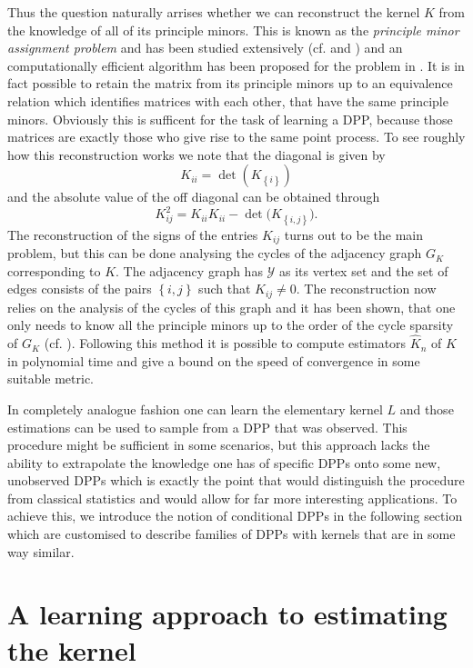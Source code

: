 Thus the question naturally arrises whether we can reconstruct the kernel \(K\) from the knowledge of all of its principle minors. This is known as the \emph{principle minor assignment problem} and has been studied extensively (cf. \cite{griffin2006principal} and \cite{urschel2017learning}) and an computationally efficient algorithm has been proposed for the problem in \cite{rising2015efficient}. It is in fact possible to retain the matrix from its principle minors up to an equivalence relation which identifies matrices with each other, that have the same principle minors. Obviously this is sufficent for the task of learning a DPP, because those matrices are exactly those who give rise to the same point process. To see roughly how this reconstruction works we note that the diagonal is given by
\[K_{ii} = \det(K_{\left\{ i\right\}})\]
and the absolute value of the off diagonal can be obtained through
\[K_{ij}^2 = K_{ii} K_{ii} - \det\big(K_{\left\{ i,j\right\}}\big). \]
The reconstruction of the signs of the entries \(K_{ij}\) turns out to be the main problem, but this can be done analysing the cycles of the adjacency graph \(G_K\) corresponding to \(K\). The adjacency graph has \(\mathcal Y\) as its vertex set and the set of edges consists of the pairs \(\left\{ i,j\right\}\) such that \(K_{ij}\ne0\). The reconstruction now relies on the analysis of the cycles of this graph and it has been shown, that one only needs to know all the principle minors up to the order of the cycle sparsity of \(G_K\) (cf. \cite{urschel2017learning}). Following this method it is possible to compute estimators \(\hat K_n\) of \(K\) in polynomial time and give a bound on the speed of convergence in some suitable metric.

In completely analogue fashion one can learn the elementary kernel \(L\) and those estimations can be used to sample from a DPP that was observed. This procedure might be sufficient in some scenarios, but this approach lacks the ability to extrapolate the knowledge one has of specific DPPs onto some new, unobserved DPPs which is exactly the point that would distinguish the procedure from classical statistics and would allow for far more interesting applications. To achieve this, we introduce the notion of conditional DPPs in the following section which are customised to describe families of DPPs with kernels that are in some way similar.

\section{A learning approach to estimating the kernel}

